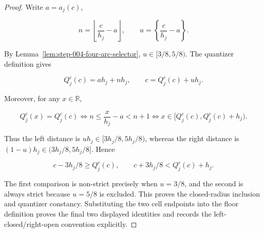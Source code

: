 \begin{proof}
Write \(a=a_j(c)\),

\[
n=\left\lfloor\frac{c}{h_j}-a\right\rfloor,
\qquad
u=\left\{\frac{c}{h_j}-a\right\}.
\]

By Lemma~\ref{lem:step-004-four-arc-selector}, \(u\in[3/8,5/8)\). The quantizer definition gives

\[
Q_j^c(c)=a h_j+n h_j,
\qquad
c=Q_j^c(c)+u h_j.
\]

Moreover, for any \(x\in\mathbb R\),

\[
Q_j^c(x)=Q_j^c(c)
\iff
n\le \frac{x}{h_j}-a<n+1
\iff
x\in[Q_j^c(c),Q_j^c(c)+h_j).
\]

Thus the left distance is \(u h_j\in[3h_j/8,5h_j/8)\), whereas the right distance is
\((1-u)h_j\in(3h_j/8,5h_j/8]\). Hence

\[
c-3h_j/8\ge Q_j^c(c),
\qquad
c+3h_j/8<Q_j^c(c)+h_j.
\]

The first comparison is non-strict precisely when \(u=3/8\), and the second is always strict because \(u=5/8\) is excluded. This proves the closed-radius inclusion and quantizer constancy. Substituting the two cell endpoints into the floor definition proves the final two displayed identities and records the left-closed/right-open convention explicitly.
\end{proof}

